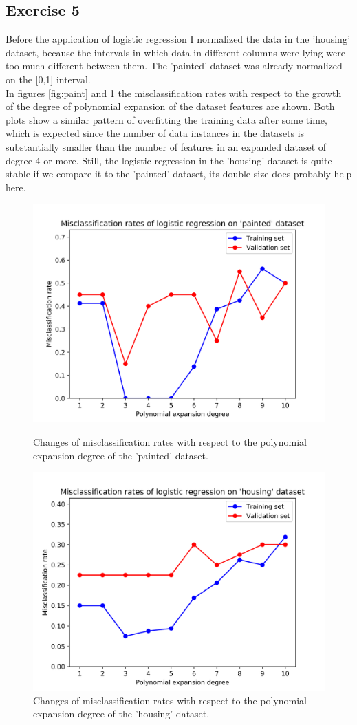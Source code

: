 \documentclass[twocolumn, 8pt]{article}
\begin{document}
\subsection*{Exercise 5} Before the application of logistic regression I normalized the data in the 'housing' dataset, because the intervals in which data in different columns were lying were too much different between them. The 'painted' dataset was already normalized on the [0,1] interval. \\

In figures \ref{fig:paint} and \ref{fig:house} the misclassification rates with respect to the growth of the degree of polynomial expansion of the dataset features are shown. Both plots show a similar pattern of overfitting the training data after some time, which is expected since the number of data instances in the datasets is substantially smaller than the number of features in an expanded dataset of degree 4 or more. Still, the logistic regression in the 'housing' dataset is quite stable if we compare it to the 'painted' dataset, its double size does probably help here.

\begin{figure}[ht]
    \centering
    \includegraphics[width=.45\textwidth]{painted2.png}
    \caption{Changes of misclassification rates with respect to the polynomial expansion degree of the 'painted' dataset.}
    \label{fig:paint}
    \includegraphics[width=.45\textwidth]{housing2.png}
    \caption{Changes of misclassification rates with respect to the polynomial expansion degree of the 'housing' dataset.}
    \label{fig:house}
\end{figure}
\end{document}

